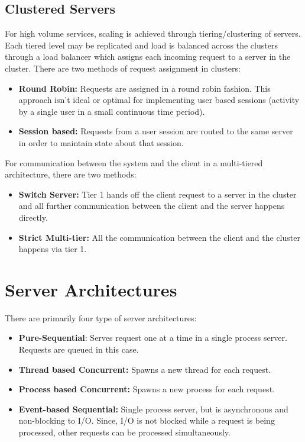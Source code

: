 \documentclass[twoside]{article}
\begin{document}
\subsection{Clustered Servers}
For high volume services, scaling is achieved through tiering/clustering of servers. Each tiered level may be replicated and load is balanced across the clusters through a load balancer which assigns each incoming request to a server in the cluster. There are two methods of request assignment in clusters:
\begin{itemize}
    \item \textbf{Round Robin:} Requests are assigned in a round robin fashion. This approach isn't ideal or optimal for implementing user based sessions (activity by a single user in a small continuous time period).
    \item \textbf{Session based:} Requests from a user session are routed to the same server in order to maintain state about that session.
\end{itemize}

For communication between the system and the client in a multi-tiered architecture, there are two methods:
\begin{itemize}
    \item \textbf{Switch Server:} Tier 1 hands off the client request to a server in the cluster and all further communication between the client and the server happens directly.
    \item \textbf{Strict Multi-tier:} All the communication between the client and the cluster happens via tier 1.
\end{itemize}
    

\section{Server Architectures}

There are primarily four type of server architectures:
\begin{itemize}
    \item \textbf{Pure-Sequential}: Serves request one at a time in a single process server. Requests are queued in this case.
    \item \textbf{Thread based Concurrent:} Spawns a new thread for each request.
    \item \textbf{Process based Concurrent:} Spawns a new process for each request.
    \item \textbf{Event-based Sequential:} Single process server, but is asynchronous and non-blocking to I/O. Since, I/O is not blocked while a request is being processed, other requests can be processed simultaneously.
\end{itemize}
\end{document}
